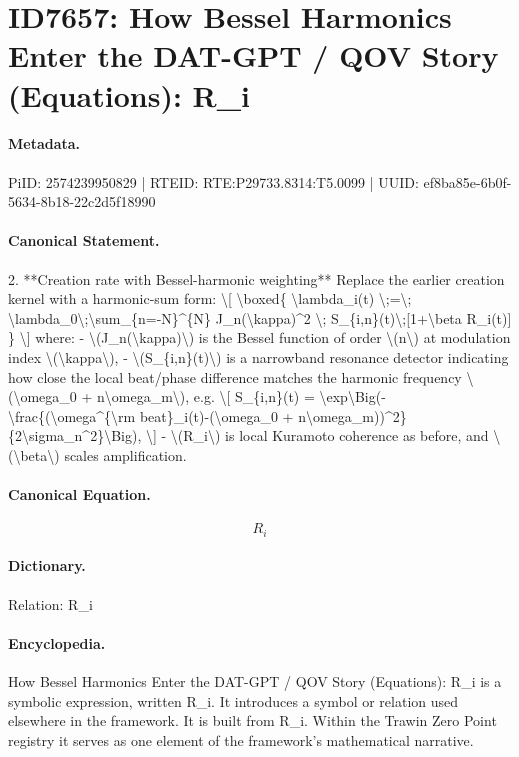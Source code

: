 \section*{ID7657: How Bessel Harmonics Enter the DAT-GPT / QOV Story (Equations): R\_i}
\paragraph{Metadata.}
PiID: 2574239950829 | RTEID: RTE:P29733.8314:T5.0099 | UUID: ef8ba85e-6b0f-5634-8b18-22c2d5f18990

\paragraph{Canonical Statement.}
2. **Creation rate with Bessel-harmonic weighting** Replace the earlier creation kernel with a harmonic-sum form: \textbackslash{}[ \textbackslash{}boxed\{ \textbackslash{}lambda\_i(t) \textbackslash{};=\textbackslash{}; \textbackslash{}lambda\_0\textbackslash{};\textbackslash{}sum\_\{n=-N\}\textasciicircum{}\{N\} J\_n(\textbackslash{}kappa)\textasciicircum{}2 \textbackslash{}; S\_\{i,n\}(t)\textbackslash{};[1+\textbackslash{}beta R\_i(t)] \} \textbackslash{}] where: - \textbackslash{}(J\_n(\textbackslash{}kappa)\textbackslash{}) is the Bessel function of order \textbackslash{}(n\textbackslash{}) at modulation index \textbackslash{}(\textbackslash{}kappa\textbackslash{}), - \textbackslash{}(S\_\{i,n\}(t)\textbackslash{}) is a narrowband resonance detector indicating how close the local beat/phase difference matches the harmonic frequency \textbackslash{}(\textbackslash{}omega\_0 + n\textbackslash{}omega\_m\textbackslash{}), e.g. \textbackslash{}[ S\_\{i,n\}(t) = \textbackslash{}exp\textbackslash{}Big(-\textbackslash{}frac\{(\textbackslash{}omega\textasciicircum{}\{\textbackslash{}rm beat\}\_i(t)-(\textbackslash{}omega\_0 + n\textbackslash{}omega\_m))\textasciicircum{}2\}\{2\textbackslash{}sigma\_n\textasciicircum{}2\}\textbackslash{}Big), \textbackslash{}] - \textbackslash{}(R\_i\textbackslash{}) is local Kuramoto coherence as before, and \textbackslash{}(\textbackslash{}beta\textbackslash{}) scales amplification.

\paragraph{Canonical Equation.}
\[
R_i
\]

\paragraph{Dictionary.}
Relation: R\_i

\paragraph{Encyclopedia.}
How Bessel Harmonics Enter the DAT-GPT / QOV Story (Equations): R\_i is a symbolic expression, written R\_i. It introduces a symbol or relation used elsewhere in the framework. It is built from R\_i. Within the Trawin Zero Point registry it serves as one element of the framework's mathematical narrative.
